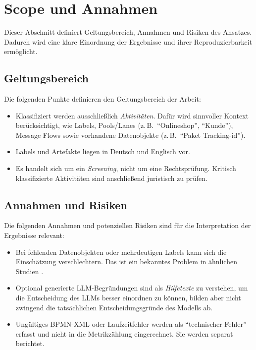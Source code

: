 \section{Scope und Annahmen}\label{sec:scope-und-annahmen}

Dieser Abschnitt definiert Geltungsbereich, Annahmen und Risiken des Ansatzes. Dadurch wird eine klare Einordnung der Ergebnisse und ihrer Reproduzierbarkeit ermöglicht.

\subsection*{Geltungsbereich}

Die folgenden Punkte definieren den Geltungsbereich der Arbeit:

\begin{itemize}
    \item Klassifiziert werden ausschließlich \emph{Aktivitäten}. Dafür wird sinnvoller Kontext berücksichtigt, wie Labels, Pools/Lanes (z.\,B.\ \enquote{Onlineshop}, \enquote{Kunde}), Message Flows sowie vorhandene Datenobjekte (z.\,B.\ \enquote{Paket Tracking-id}).
    \item Labels und Artefakte liegen in Deutsch und Englisch vor.
    \item Es handelt sich um ein \emph{Screening}, nicht um eine Rechtsprüfung. Kritisch klassifizierte Aktivitäten sind anschließend juristisch zu prüfen.
\end{itemize}

\subsection*{Annahmen und Risiken}

Die folgenden Annahmen und potenziellen Risiken sind für die Interpretation der Ergebnisse relevant:

\begin{itemize}
    \item Bei fehlenden Datenobjekten oder mehrdeutigen Labels kann sich die Einschätzung verschlechtern. Das ist ein bekanntes Problem in ähnlichen Studien \cite{nake2023towards}.
    \item Optional generierte \ac{LLM}-Begründungen sind als \emph{Hilfetexte} zu verstehen, um die Entscheidung des \acp{LLM} besser einordnen zu können, bilden aber nicht zwingend die tatsächlichen Entscheidungsgründe des Modells ab.
    \item Ungültiges \ac{BPMN}-XML oder Laufzeitfehler werden als \enquote{technischer Fehler} erfasst und nicht in die Metrikzählung eingerechnet. Sie werden separat berichtet.
\end{itemize}